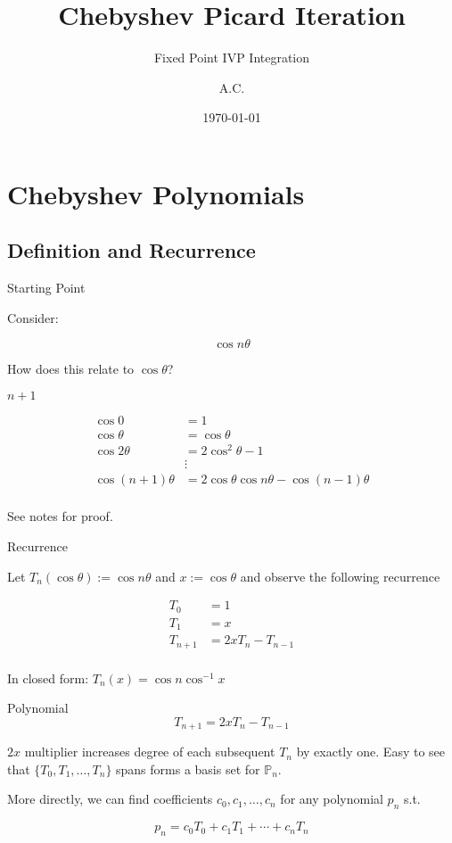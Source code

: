 \documentclass[pdf]{beamer}
\title{Chebyshev Picard Iteration}
\subtitle{Fixed Point IVP Integration}
\author{A.C.}
\date{\today}
\begin{document}
\begin{frame}
  \titlepage
\end{frame}

\section{Chebyshev Polynomials}

\subsection{Definition and Recurrence}

\begin{frame}{Starting Point}

  Consider:
   
  \[ \cos n \theta \]

  How does this relate to $\cos \theta$?
\end{frame}

\begin{frame}{$n+1$}

\begin{align*}
  \cos 0 &= 1\\
  \cos \theta &= \cos \theta\\
  \cos 2\theta &= 2\cos^2 \theta - 1\\
   & \vdots\\
  \cos (n+1)\theta &= 2 \cos \theta \cos n\theta - \cos (n-1)\theta\\
\end{align*}

See notes for proof.
  
\end{frame}

\begin{frame}{Recurrence}

Let $T_n(\cos \theta) := \cos n \theta$ and $x := \cos \theta$ and observe the following recurrence

\begin{align*}
  T_0 &= 1\\
  T_1 &= x\\
  T_{n+1} &= 2xT_n - T_{n-1}\\
\end{align*}

In closed form: $T_n(x) = \cos n \cos^{-1} x$

\end{frame}

\begin{frame}{Polynomial}
  \[ T_{n+1} = 2xT_n - T_{n-1} \]

  $2x$ multiplier increases degree of each subsequent $T_n$ by exactly one.
  Easy to see that $\{T_0, T_1, \ldots, T_n \}$ spans forms a basis set for
  $\mathbb{P}_n$.\newline

  More directly, we can find coefficients $c_0, c_1, \ldots, c_n$ for any
  polynomial $p_n$ s.t.

  \[ p_n = c_0T_0 + c_1T_1 + \cdots + c_nT_n \]
\end{frame}
\end{document}
